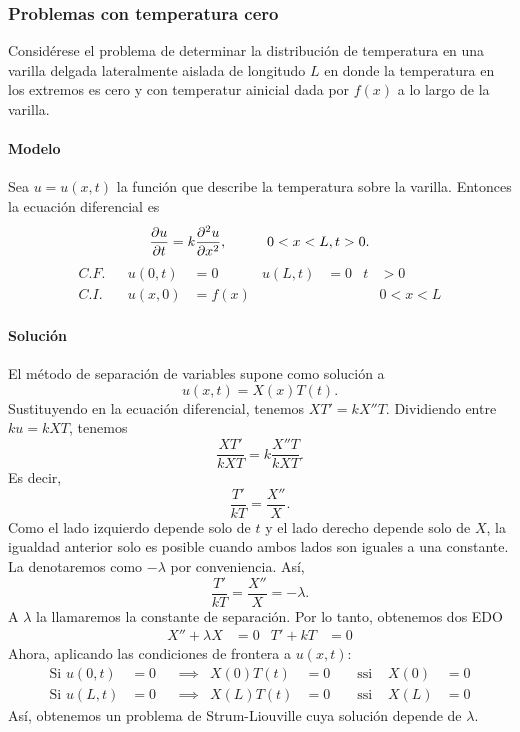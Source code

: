 \documentclass[11pt,letterpaper]{report}
\newcommand\<{\langle}
\renewcommand\>{\rangle}
\begin{document}
\subsubsection{Problemas con temperatura cero}
Considérese el problema de determinar la distribución de
temperatura en una varilla delgada lateralmente aislada de
longitudo $L$ en donde la temperatura en los extremos es cero y
con temperatur ainicial dada por $f(x)$ a lo largo de la varilla.

\paragraph{Modelo}
Sea $u=u(x,t)$ la función que describe la temperatura sobre la
varilla. Entonces la ecuación diferencial es
\[
  \frac{\partial u}{\partial t}
  = k
  \frac{\partial^2 u}{\partial x^2},
  \hspace{10mm} 0<x<L, t>0
.\]
\begin{align*}
  C.F. && u(0,t) &= 0 & u(L,t) &= 0 &t&>0 \\
  C.I. && u(x,0) &= f(x) & &&& 0<x<L
\end{align*}

\paragraph{Solución}
El método de separación de variables supone como solución a
\[
  u(x,t) = X(x)T(t)
.\]
Sustituyendo en la ecuación diferencial, tenemos $XT'=kX''T$.
Dividiendo entre $ku=kXT$, tenemos
\[
  \frac{XT'}{kXT} = k \frac{X''T}{kXT}
.\]
Es decir,
\[
  \frac{T'}{kT} = \frac{X''}{X}
.\]
Como el lado izquierdo depende solo de $t$ y el lado derecho
depende solo de $X$, la igualdad anterior solo es posible cuando
ambos lados son iguales a una constante. La denotaremos como
$-\lambda$ por conveniencia.
Así,
\[
  \frac{T'}{kT} = \frac{X''}{X} = -\lambda
.\]
A $\lambda$ la llamaremos la constante de separación.
Por lo tanto, obtenemos dos EDO
\begin{align*}
  X'' + \lambda X &= 0
  &
  T' + kT &= 0
\end{align*}
Ahora, aplicando las condiciones de frontera a $u(x,t)$:
\begin{align*}
  \text{Si } u(0,t)&=0
  & &\implies &
  X(0)T(t)&=0
  & &\text{ ssi } &
  X(0)&=0 \\
  \text{Si } u(L,t)&=0
  & &\implies &
  X(L)T(t)&=0
  & &\text{ ssi } &
  X(L)&=0
\end{align*}
Así, obtenemos un problema de Strum-Liouville cuya solución
depende de $\lambda$.
\end{document}
